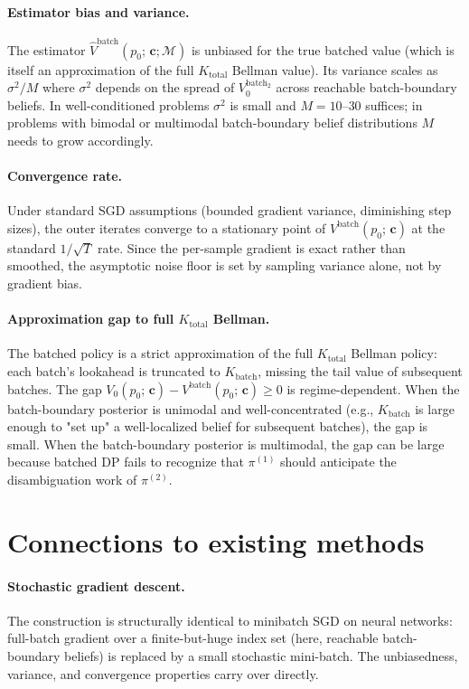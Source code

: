 \documentclass[11pt,a4paper]{article}
\newcommand{\bc}{\bm{c}}
\begin{document}
\paragraph{Estimator bias and variance.}  The estimator
$\widehat{V}^\mathrm{batch}(p_0;\, \bc; \mathcal{M})$ is unbiased for the true batched
value (which is itself an approximation of the full $K_\mathrm{total}$ Bellman value).
Its variance scales as $\sigma^2 / M$ where $\sigma^2$ depends on the spread of
$V_0^{\mathrm{batch}_2}$ across reachable batch-boundary beliefs.  In well-conditioned
problems $\sigma^2$ is small and $M = 10$--$30$ suffices; in problems with bimodal or
multimodal batch-boundary belief distributions $M$ needs to grow accordingly.

\paragraph{Convergence rate.}  Under standard SGD assumptions (bounded gradient variance,
diminishing step sizes), the outer iterates converge to a stationary point of
$V^\mathrm{batch}(p_0;\, \bc)$ at the standard $1/\sqrt{T}$ rate.  Since the per-sample
gradient is exact rather than smoothed, the asymptotic noise floor is set by sampling
variance alone, not by gradient bias.

\paragraph{Approximation gap to full $K_\mathrm{total}$ Bellman.}  The batched policy is a
strict approximation of the full $K_\mathrm{total}$ Bellman policy: each batch's lookahead
is truncated to $K_\mathrm{batch}$, missing the tail value of subsequent batches.  The gap
$V_0(p_0;\, \bc) - V^\mathrm{batch}(p_0;\, \bc) \ge 0$ is regime-dependent.  When the
batch-boundary posterior is unimodal and well-concentrated (e.g., $K_\mathrm{batch}$ is
large enough to "set up" a well-localized belief for subsequent batches), the gap is small.
When the batch-boundary posterior is multimodal, the gap can be large because batched DP
fails to recognize that $\pi^{(1)}$ should anticipate the disambiguation work of $\pi^{(2)}$.

\section{Connections to existing methods}
\label{sec:related}

\paragraph{Stochastic gradient descent.}  The construction is structurally identical to
minibatch SGD on neural networks: full-batch gradient over a finite-but-huge index set
(here, reachable batch-boundary beliefs) is replaced by a small stochastic mini-batch.  The
unbiasedness, variance, and convergence properties carry over directly.
\end{document}
